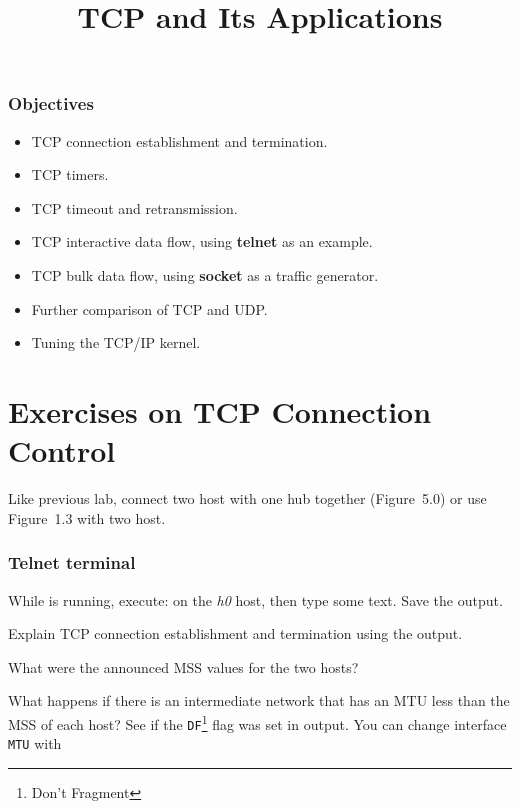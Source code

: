 \documentclass{../UTNetLab}
\title{TCP and Its Applications}
\begin{document}
\section*{Objectives}
\begin{itemize}
    \item TCP connection establishment and termination.
    \item TCP timers.
    \item TCP timeout and retransmission.
    \item TCP interactive data flow, using \textbf{telnet} as an example.
    \item TCP bulk data flow, using \textbf{socket} as a traffic generator.
    \item Further comparison of TCP and UDP.
    \item Tuning the TCP/IP kernel.
\end{itemize}

\part{Exercises on TCP Connection Control}
Like previous lab, connect two host with one hub together (Figure~5.0) or use Figure~1.3 with two host.

\section{Telnet terminal}
While  is running, execute:  on the \textit{h0} host, then type some text.
Save the  output.

\begin{report}
    \item Explain TCP connection establishment and termination using the  output.

    \item What were the announced MSS values for the two hosts?

    \item What happens if there is an intermediate network that has an MTU less than the MSS of each host?
    See if the \texttt{DF}\footnote{Don't Fragment} flag was set in  output.
    You can change interface \texttt{MTU} with 
\end{report}
\end{document}
